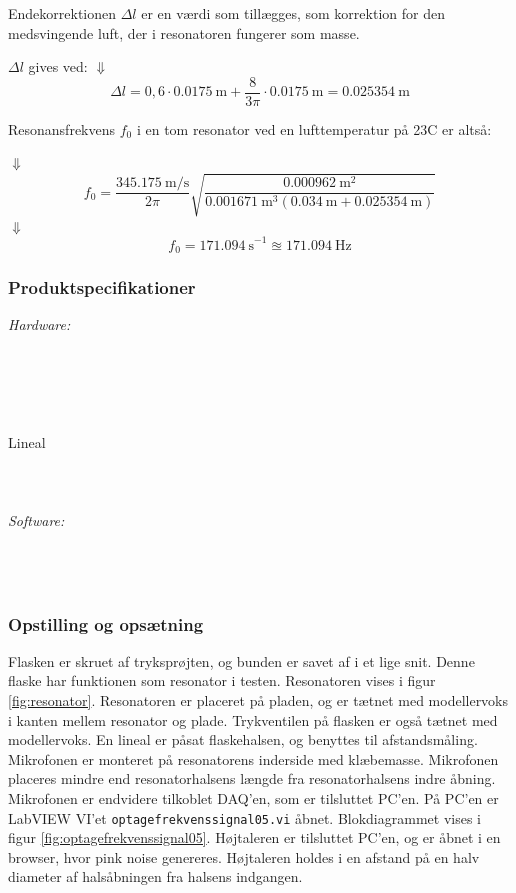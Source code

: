 Endekorrektionen $\Delta l$ er en værdi som tillægges, som korrektion for den medsvingende luft, der i resonatoren fungerer som masse. 

$\Delta l$ gives ved: \deltal
$\Downarrow$
\begin{equation}
		\Delta l = 0,6 \cdot {\SI{0,0175}{\meter}} + \frac{8}{3\pi} \cdot {\SI{0,0175}{\meter}} = {\SI{0,025354}{\meter}} 
\end{equation}

Resonansfrekvens $f_{0}$ i en tom resonator ved en lufttemperatur på 23\degree C er altså:

\fnul
$\Downarrow$   
\begin{equation}
		f_{0} = \frac{\SI{345,175}{\meter / \second}}{2\pi}\sqrt{\frac{\SI{0,000962}{\meter^{2}}}{{\SI{0,001671}{\meter^{3}}}({\SI{0,034}{\meter}}+{\SI{0,025354}{\meter}})}} 
	\end{equation}	
$\Downarrow$
\begin{equation}
	f_{0} = {\SI{171,094}{\second}^{-1}} \approxeq {\SI{171,094}{\hertz}} 	
	\end{equation}


	\subsubsection{Produktspecifikationer}
	\textit{Hardware:}\\
	\\
	\elektretto\\
	\daq\\
	\\	
	\snot\\	
	Lineal\\
	\modellervoks\\
	\plade\\
	\PC\\
	
	\textit{Software:}\\
	\labview\\
	\daqsoft\\
	\onlineg\\
	
	\subsubsection{Opstilling og opsætning}
	Flasken er skruet af tryksprøjten, og bunden er savet af i et lige snit. Denne flaske har funktionen som resonator i testen. Resonatoren vises i figur \ref{fig:resonator}. Resonatoren er placeret på pladen, og er tætnet med modellervoks i kanten mellem resonator og plade. Trykventilen på flasken er også tætnet med modellervoks. En lineal er påsat flaskehalsen, og benyttes til afstandsmåling. Mikrofonen er monteret på resonatorens inderside med klæbemasse. Mikrofonen placeres mindre end resonatorhalsens længde fra resonatorhalsens indre åbning. Mikrofonen er endvidere tilkoblet DAQ'en, som er tilsluttet PC'en. På PC'en er LabVIEW VI'et \texttt{optagefrekvenssignal05.vi} åbnet. Blokdiagrammet vises i figur \ref{fig:optagefrekvenssignal05}. Højtaleren er tilsluttet PC'en, og \onlineg er åbnet i en browser, hvor pink noise genereres. Højtaleren holdes i en afstand på en halv diameter af halsåbningen fra halsens indgangen.  
	
